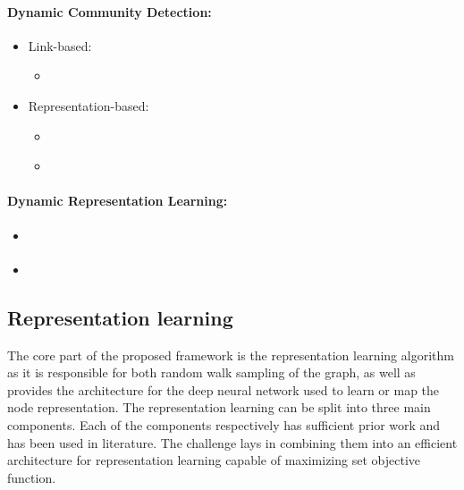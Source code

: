 \documentclass[
acmsmall,
nonacm,
screen,
acmthm]{acmart}
\providecommand{\tightlist}{%
\setlength{\itemsep}{0pt}\setlength{\parskip}{0pt}}
\begin{document}
\hypertarget{dynamic-community-detection-1}{%
\paragraph{Dynamic Community
Detection:}\label{dynamic-community-detection-1}}

\begin{itemize}
\tightlist
\item
  Link-based:

  \begin{itemize}
  \tightlist
  \item
    \citet{rossettiANGELEfficientEffective2020}
  \end{itemize}
\item
  Representation-based:

  \begin{itemize}
  \tightlist
  \item
    \citet{wangEvolutionaryAutoencoderDynamic2020}
  \item
    \citet{maCommunityawareDynamicNetwork2020}
  \end{itemize}
\end{itemize}

\hypertarget{dynamic-representation-learning}{%
\paragraph{Dynamic Representation
Learning:}\label{dynamic-representation-learning}}

\begin{itemize}
\tightlist
\item
  \citet{nguyenContinuousTimeDynamicNetwork2018}
\item
  \citet{wuSageDyNovelSampling2021}
\end{itemize}

\hypertarget{representation-learning}{%
\subsection{Representation learning}\label{representation-learning}}

The core part of the proposed framework is the representation learning
algorithm as it is responsible for both random walk sampling of the
graph, as well as provides the architecture for the deep neural network
used to learn or map the node representation. The representation
learning can be split into three main components. Each of the components
respectively has sufficient prior work and has been used in literature.
The challenge lays in combining them into an efficient architecture for
representation learning capable of maximizing set objective function.
\end{document}
